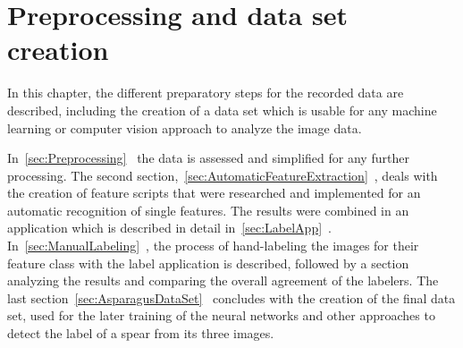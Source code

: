 \section{Preprocessing and data set creation}
\label{ch:Dataset}

In this chapter, the different preparatory steps for the recorded data are described, including the creation of a data set which is usable for any machine learning or computer vision approach to analyze the image data.

In~\ref{sec:Preprocessing}~ the data is assessed and simplified for any further processing. The second section,~\ref{sec:AutomaticFeatureExtraction}~, deals with the creation of feature scripts that were researched and implemented for an automatic recognition of single features.
The results were combined in an application which is described in detail in~\ref{sec:LabelApp}~. In~\ref{sec:ManualLabeling}~, the process of hand-labeling the images for their feature class with the label application is described, followed by a section analyzing the results and comparing the overall agreement of the labelers. The last section~\ref{sec:AsparagusDataSet}~ concludes with the creation of the final data set, used for the later training of the neural networks and other approaches to detect the label of a spear from its three images.

